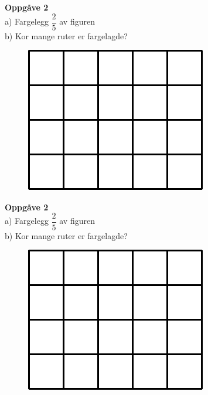 \textbf{Oppgåve 2} \\
a) Fargelegg $ \dfrac{2}{5} $ av figuren\\
b) Kor mange ruter er fargelagde?
\begin{figure}
	\includegraphics{farg2_5}
\end{figure}\vspace{10pt}

\textbf{Oppgåve 2} \\
a) Fargelegg $ \dfrac{2}{5} $ av figuren\\
b) Kor mange ruter er fargelagde?
\begin{figure}
	\includegraphics{farg2_5}
\end{figure}
